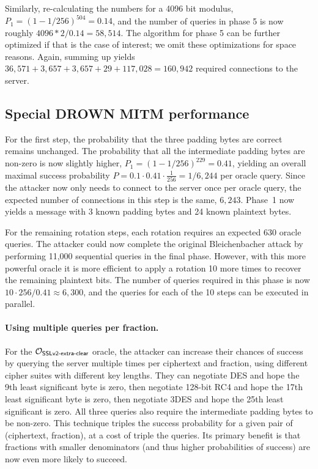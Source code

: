 Similarly, re-calculating the numbers for a 4096 bit modulus, $P_1 = (1 - 1/256)^{504} = 0.14$, and the number of queries in phase 5 is now roughly $4096 * 2 / 0.14 = 58,514$. The algorithm for phase 5 can be further optimized if that is the case of interest; we omit these optimizations for space reasons. Again, summing up yields $36,571 + 3,657 + 3,657 + 29 + 117,028 = 160,942$ required connections to the server.
\fi

\balance

\subsection{Special DROWN MITM performance}
\label{sec:special-performance}

For the first step, the probability that the three padding bytes are correct remains unchanged. The probability that all the intermediate padding bytes are non-zero is now slightly higher, $P_1 = (1 - 1/256)^{229} = 0.41$, yielding an overall maximal success probability $P = 0.1 \cdot 0.41 \cdot \frac{1}{256} = 1/6,244$ per oracle query. Since the attacker now only needs to connect to the server once per oracle query, the expected number of connections in this step is the same, $6,243$. Phase~1 now yields a message with 3 known padding bytes and 24 known plaintext bytes.

For the remaining rotation steps, each rotation requires an expected 630 oracle queries.  The attacker could now complete the original Bleichenbacher attack by performing 11,000 sequential queries in the final phase.  However, with this more powerful oracle it is more efficient to apply a rotation 10 more times to recover the remaining plaintext bits. The number of queries required in this phase is now $10\cdot 256/0.41\approx 6,300$, and the queries for each of the 10 steps can be executed in parallel.

\paragraph{Using multiple queries per fraction.}
For the $\mathcal{O}_\textsf{SSLv2-extra-clear}$ oracle, the attacker can increase their chances of
success by querying the server multiple times per
ciphertext and fraction, using different cipher suites with different key lengths. They can negotiate DES and hope
the 9th least significant byte is zero, then negotiate 128-bit RC4
and hope the 17th least significant byte is zero, then negotiate
3DES and hope the 25th least significant is zero. All three queries also require
the intermediate padding bytes to be non-zero. This technique
triples the success probability for a given pair of (ciphertext, fraction),
at a cost of triple the queries. Its primary benefit is that fractions with smaller
denominators (and thus higher probabilities of success) are now even more likely
to succeed.

